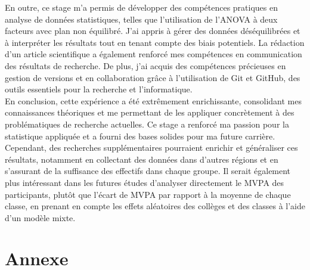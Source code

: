 \documentclass[12pt,a4paper]{article}
\renewcommand{\sectionmark}[1]{\markboth{#1}{}}
\begin{document}
En outre, ce stage m'a permis de développer des compétences pratiques en analyse de données statistiques, telles que l'utilisation de l'ANOVA à deux facteurs avec plan non équilibré. J'ai appris à gérer des données déséquilibrées et à interpréter les résultats tout en tenant compte des biais potentiels. La rédaction d'un article scientifique a également renforcé mes compétences en communication des résultats de recherche. De plus, j'ai acquis des compétences précieuses en gestion de versions et en collaboration grâce à l'utilisation de Git et GitHub, des outils essentiels pour la recherche et l'informatique.\\
En conclusion, cette expérience a été extrêmement enrichissante, consolidant mes connaissances théoriques et me permettant de les appliquer concrètement à des problématiques de recherche actuelles. Ce stage a renforcé ma passion pour la statistique appliquée et a fourni des bases solides pour ma future carrière. Cependant, des recherches supplémentaires pourraient enrichir et généraliser ces résultats, notamment en collectant des données dans d'autres régions et en s'assurant de la suffisance des effectifs dans chaque groupe. Il serait également plus intéressant dans les futures études d'analyser directement le MVPA des participants, plutôt que l'écart de MVPA par rapport à la moyenne de chaque classe, en prenant en compte les effets aléatoires des collèges et des classes à l'aide d'un modèle mixte.






\newpage
\section*{Annexe}
\sectionmark{Annexe}
\end{document}
